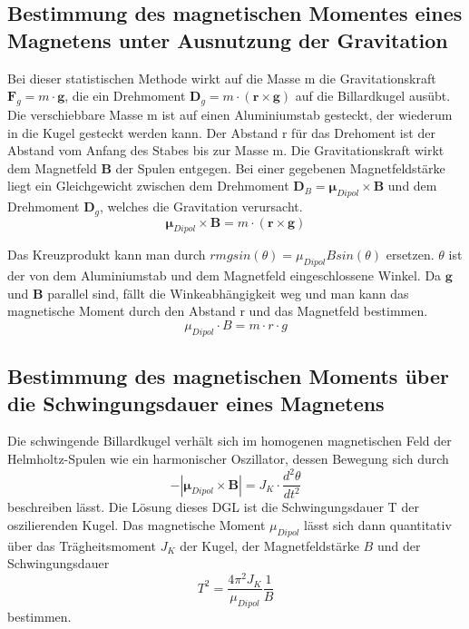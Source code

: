\subsection{Bestimmung des magnetischen Momentes eines Magnetens unter Ausnutzung der Gravitation}
\label{sec:Gravitation}
Bei dieser statistischen Methode wirkt auf die Masse m die Gravitationskraft $\symbf{F}_g = m \cdot \symbf{g}$, 
die ein Drehmoment $\symbf{D}_g = m \cdot (\symbf{r} \times \symbf{g})$ auf die Billardkugel ausübt.
Die verschiebbare Masse m ist auf einen Aluminiumstab gesteckt, der wiederum in die Kugel gesteckt werden kann.
Der Abstand r für das Drehoment ist der Abstand vom Anfang des Stabes bis zur Masse m.
Die Gravitationskraft wirkt dem Magnetfeld $\symbf{B}$ der Spulen entgegen.
Bei einer gegebenen Magnetfeldstärke liegt ein Gleichgewicht zwischen dem Drehmoment $\symbf{D}_B = \symbf{\mu}_{Dipol} \times \symbf{B}$ und dem Drehmoment $\symbf{D}_g$,
welches die Gravitation verursacht.
\begin{equation}
    \symbf{\mu}_{Dipol} \times \symbf{B} = m \cdot (\symbf{r} \times \symbf{g})
\end{equation}

Das Kreuzprodukt kann man durch $ r m g sin(\theta) = \mu_{Dipol} B sin(\theta)$ ersetzen.
$\theta$ ist der von dem Aluminiumstab und dem Magnetfeld eingeschlossene Winkel.
Da $\symbf{g}$ und $\symbf{B}$ parallel sind, fällt die Winkeabhängigkeit weg und man kann das magnetische Moment durch den Abstand r und das Magnetfeld bestimmen.
\begin{equation}
    \mu_{Dipol} \cdot B = m \cdot r \cdot g
\end{equation}


\subsection{Bestimmung des magnetischen Moments über die Schwingungsdauer eines Magnetens}
\label{sec:Schwingungsdauer}
Die schwingende Billardkugel verhält sich im homogenen magnetischen Feld der Helmholtz-Spulen wie ein harmonischer Oszillator, 
dessen Bewegung sich durch 
\begin{equation}
    -|\symbf{\mu}_{Dipol} \times \symbf{B}| = J_K \cdot \frac{d^2\theta}{dt^2}
\end{equation}
beschreiben lässt. Die Lösung dieses DGL ist die Schwingungsdauer T der oszilierenden Kugel.
Das magnetische Moment $\mu_{Dipol}$ lässt sich dann quantitativ über das Trägheitsmoment $J_K$ der Kugel,
der Magnetfeldstärke $B$ und der Schwingungsdauer
\begin{equation}
    T^2 = \frac{4 \pi^2 J_K}{\mu_{Dipol}} \frac{1}{B}
\end{equation}
bestimmen.

